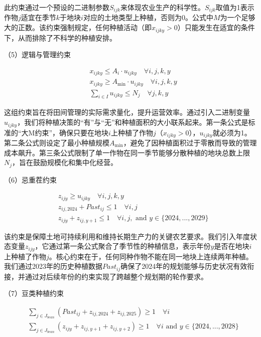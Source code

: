 \documentclass[withoutpreface,bwprint]{cumcmthesis} %
\begin{document}
此约束通过一个预设的二进制参数$S_{ijk}$来体现农业生产的科学性。$S_{ijk}$取值为1表示作物$j$适宜在季节$k$于地块$i$对应的土地类型上种植，否则为0。公式中$M$为一个足够大的正数。该约束强制规定，任何种植活动（即$x_{ijky} > 0$）只能发生在适宜的条件下，从而排除了不科学的种植安排。

（5）逻辑与管理约束


\begin{align}
	 & x_{ijky} \le A_i \cdot u_{ijky} \quad \forall i, j, k, y      \\
	 & x_{ijky} \ge A_{\min} \cdot u_{ijky} \quad \forall i, j, k, y \\
	 & \sum_{i \in I} u_{ijky} \le N_j \quad \forall j, k, y
\end{align}


这组约束旨在将田间管理的实际需求量化，提升运营效率。通过引入二进制变量$u_{ijky}$，我们将种植决策的“有”与“无”和种植面积的大小联系起来。第一条公式是标准的“大M约束”，确保只要在地块$i$上种植了作物$j$（$x_{ijky} > 0$），$u_{ijky}$就必须为1。第二条公式则设定了最小种植规模$A_{\min}$，避免了因种植面积过于零散而导致的管理成本飙升。第三条公式限制了单一作物在同一季节能够分散种植的地块总数上限$N_j$，旨在鼓励规模化和集中化经营。

（6）忌重茬约束


\begin{align}
	 & z_{ijy} \ge u_{ijky} \quad \forall i, j, k, y                                       \\
	 & z_{ij,2024} + Past_{ij} \le 1 \quad \forall i, j                                    \\
	 & z_{ijy} + z_{ij,y+1} \le 1 \quad \forall i, j, \text{ and } y \in \{2024,...,2029\}
\end{align}


该约束是保障土地可持续利用和维持长期生产力的关键农艺要求。我们引入年度状态变量$z_{ijy}$，它通过第一条公式聚合了季节性的种植信息，表示年份$y$是否在地块$i$上种植了作物$j$。核心约束在于，任何同种作物不能在同一地块上连续两年种植。我们通过2023年的历史种植数据$Past_{ij}$确保了2024年的规划能够与历史状况有效衔接，并通过对后续年份的约束实现了跨越整个规划期的轮作要求。

（7）豆类种植约束


\begin{align}
	 & \sum_{j \in J_{bean}} (Past_{ij} + z_{ij,2024} + z_{ij,2025}) \ge 1 \quad \forall i                                  \\
	 & \sum_{j \in J_{bean}} (z_{ijy} + z_{ij,y+1} + z_{ij,y+2}) \ge 1 \quad \forall i \text{ and } y \in \{2024,...,2028\}
\end{align}
\end{document}
